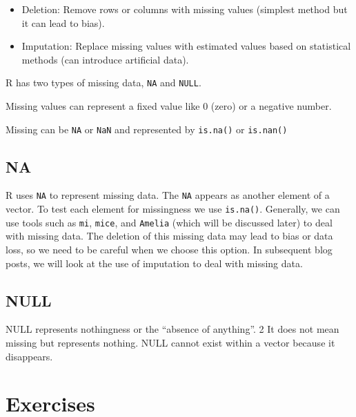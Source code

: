 \documentclass[
  letterpaper,
  DIV=11,
  numbers=noendperiod]{scrreprt}
\begin{document}
\begin{itemize}
\item
  Deletion: Remove rows or columns with missing values (simplest method
  but it can lead to bias).
\item
  Imputation: Replace missing values with estimated values based on
  statistical methods (can introduce artificial data).
\end{itemize}

R has two types of missing data, \texttt{NA} and \texttt{NULL}.

Missing values can represent a fixed value like 0 (zero) or a negative
number.

Missing can be \texttt{NA} or \texttt{NaN} and represented by
\texttt{is.na()} or \texttt{is.nan()}

\subsection{NA}\label{na}

R uses \texttt{NA} to represent missing data. The \texttt{NA} appears as
another element of a vector. To test each element for missingness we use
\texttt{is.na()}. Generally, we can use tools such as \texttt{mi},
\texttt{mice}, and \texttt{Amelia} (which will be discussed later) to
deal with missing data. The deletion of this missing data may lead to
bias or data loss, so we need to be careful when we choose this option.
In subsequent blog posts, we will look at the use of imputation to deal
with missing data.

\subsection{NULL}\label{null}

NULL represents nothingness or the ``absence of anything''. 2 It does
not mean missing but represents nothing. NULL cannot exist within a
vector because it disappears.

\section{Exercises}\label{exercises-11}
\end{document}
